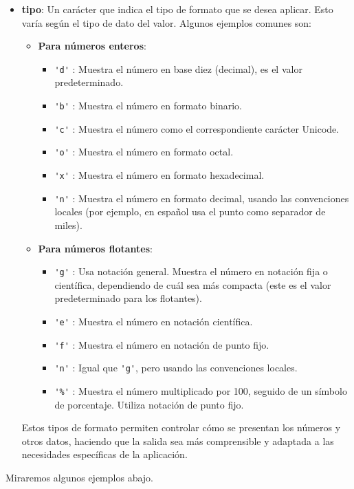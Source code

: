 \begin{itemize}
\item \textbf{tipo}: Un carácter que indica el tipo de formato que se desea aplicar. Esto varía según el tipo de dato del valor. Algunos ejemplos comunes son:
\begin{itemize}
    \item \textbf{Para números enteros}:
    \begin{itemize}
        \item \verb|'d'| : Muestra el número en base diez (decimal), es el valor predeterminado.
        \item \verb|'b'| : Muestra el número en formato binario.
        \item \verb|'c'| : Muestra el número como el correspondiente carácter Unicode.
        \item \verb|'o'| : Muestra el número en formato octal.
        \item \verb|'x'| : Muestra el número en formato hexadecimal.
        \item \verb|'n'| : Muestra el número en formato decimal, usando las convenciones locales (por ejemplo, en español usa el punto como separador de miles).
    \end{itemize}
    \item \textbf{Para números flotantes}:
    \begin{itemize}
        \item \verb|'g'| : Usa notación general. Muestra el número en notación fija o científica, dependiendo de cuál sea más compacta (este es el valor predeterminado para los flotantes).
        \item \verb|'e'| : Muestra el número en notación científica.
        \item \verb|'f'| : Muestra el número en notación de punto fijo.
        \item \verb|'n'| : Igual que \verb|'g'|, pero usando las convenciones locales.
        \item \verb|'%'| : Muestra el número multiplicado por 100, seguido de un símbolo de porcentaje. Utiliza notación de punto fijo.
    \end{itemize}
\end{itemize}
Estos tipos de formato permiten controlar cómo se presentan los números y otros datos, haciendo que la salida sea más comprensible y adaptada a las necesidades específicas de la aplicación.

\end{itemize}


Miraremos algunos ejemplos abajo. 

